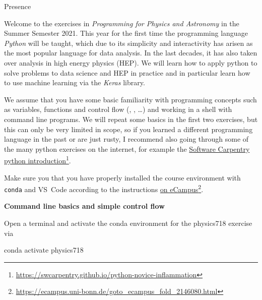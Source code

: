 \documentclass[a4paper]{article}
\begin{document}


\begin{exam}[Presence]{Presence}
  \begin{instructions}[Introduction]

    Welcome to the exercises in \emph{Programming for Physics and Astronomy} in
    the Summer Semester 2021. This year for the first time the programming
    language \emph{Python} will be taught, which due to its simplicity and
    interactivity has arisen as the most popular language for data analysis. In
    the last decades, it has also taken over analysis in high energy physics (HEP). We
    will learn how to apply python to solve problems to data science and HEP in
    practice and in particular learn how to use machine learning via the
    \emph{Keras} library.

    We assume that you have some basic familiarity with programming concepts
    such as variables, functions and control flow (,
    , \ldots) and working in a shell with command line programs.
    We will repeat some basics in the first two exercises, but this can only be
    very limited in scope, so if you learned a different programming language in
    the past or are just rusty, I recommend also going through some of the many
    python exercises on the internet, for example the
    \href{https://swcarpentry.github.io/python-novice-inflammation}{Software
      Carpentry python introduction}\footnote{%
      \url{https://swcarpentry.github.io/python-novice-inflammation}}.
  \end{instructions}

  \begin{instructions}
   Make sure you that you have properly installed the course environment with
   \texttt{conda} and VS~Code according to the instructions
   \href{https://ecampus.uni-bonn.de/goto_ecampus_fold_2146080.html}{%
     on eCampus}\footnote{%
     \url{https://ecampus.uni-bonn.de/goto_ecampus_fold_2146080.html}}.

    \begin{problem*}\textbf{Command line basics and simple control flow}

      Open a terminal and activate the conda environment for the physics718
      exercise via

      \begin{bashcode}
        conda activate physics718
      \end{bashcode}


\end{problem*}
\end{instructions}
\end{exam}
\end{document}

